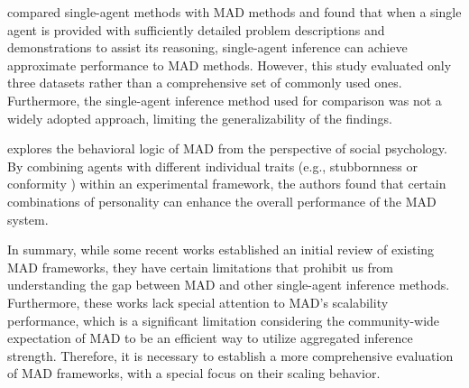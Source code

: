 \citet{wang2024rethinking} compared single-agent methods with MAD methods and found that when a single agent is provided with sufficiently detailed problem descriptions and demonstrations to assist its reasoning, single-agent inference can achieve approximate performance to MAD methods. However, this study evaluated only three datasets rather than a comprehensive set of commonly used ones. Furthermore, the single-agent inference method used for comparison was not a widely adopted approach, limiting the generalizability of the findings.

\citet{zhang2023exploring} explores the behavioral logic of MAD from the perspective of social psychology. By combining agents with different individual traits (e.g., stubbornness or conformity ) within an experimental framework, the authors found that certain combinations of personality can enhance the overall performance of the MAD system.


In summary, while some recent works established an initial review of existing MAD frameworks, they have certain limitations that prohibit us from understanding the gap between MAD and other single-agent inference methods. Furthermore, these works lack special attention to MAD's scalability performance, which is a significant limitation considering the community-wide expectation of MAD to be an efficient way to utilize aggregated inference strength. Therefore, it is necessary to establish a more comprehensive evaluation of MAD frameworks, with a special focus on their scaling behavior.
